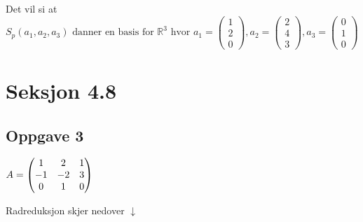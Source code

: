 \documentclass{article}
\newcommand{\vect}[1]{\begin{pmatrix} #1 \end{pmatrix}}
\newcommand{\uu}[1]{\underline{\underline{#1}}}
\begin{document}
\begin{enumerate}[a)]
    Det vil si at \uu{\(S_p(a_1, a_2, a_3) \text{ danner en basis for $\mathbb{R}^3$ hvor } a_1 = \vect{1\\2\\0}, a_2 = \vect{2\\4\\3}, a_3 = \vect{0\\1\\0}\)}
    
\end{enumerate}

\newpage
\section*{Seksjon 4.8}
\subsection*{Oppgave 3}
\(A = \vect{1&2&1\\-1&-2&3\\0&1&0} \\\)

Radreduksjon skjer nedover $\downarrow$ \\
\end{document}
